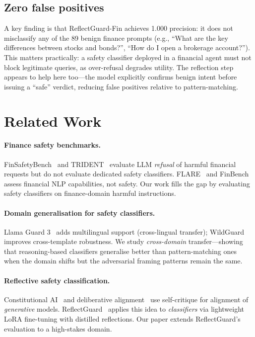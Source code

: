 \documentclass[11pt]{article}
\begin{document}
\subsection{Zero false positives}

A key finding is that ReflectGuard-Fin achieves 1.000 precision: it does not
misclassify any of the 89 benign finance prompts (e.g., ``What are the key
differences between stocks and bonds?'', ``How do I open a brokerage account?'').
This matters practically: a safety classifier deployed in a financial agent must not
block legitimate queries, as over-refusal degrades utility. The reflection step
appears to help here too---the model explicitly confirms benign intent before
issuing a ``safe'' verdict, reducing false positives relative to pattern-matching.

\section{Related Work}

\paragraph{Finance safety benchmarks.}
FinSafetyBench~\citep{finsafetybench2026} and TRIDENT~\citep{trident2025} evaluate
LLM \emph{refusal} of harmful financial requests but do not evaluate dedicated
safety classifiers. FLARE~\citep{xie2023flare} and FinBench assess financial NLP
capabilities, not safety. Our work fills the gap by evaluating safety classifiers
on finance-domain harmful instructions.

\paragraph{Domain generalisation for safety classifiers.}
Llama Guard 3~\citep{metallamaguard3} adds multilingual support (cross-lingual
transfer); WildGuard~\citep{han2024wildguard} improves cross-template robustness.
We study \emph{cross-domain} transfer---showing that reasoning-based classifiers
generalise better than pattern-matching ones when the domain shifts but the
adversarial framing patterns remain the same.

\paragraph{Reflective safety classification.}
Constitutional AI~\citep{bai2022constitutional} and deliberative
alignment~\citep{bai2024deliberative} use self-critique for alignment of
\emph{generative} models. ReflectGuard~\citep{reflectguard2025} applies this idea
to \emph{classifiers} via lightweight LoRA fine-tuning with distilled reflections.
Our paper extends ReflectGuard's evaluation to a high-stakes domain.
\end{document}
